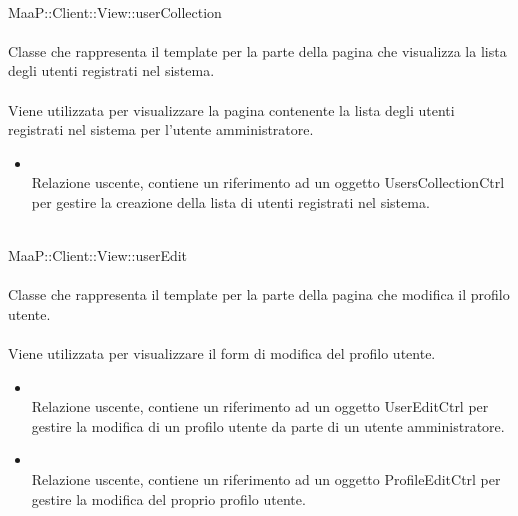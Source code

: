 \\
MaaP::Client::View::userCollection\\
\\
Classe che rappresenta il template per la parte della pagina che visualizza la lista degli utenti registrati nel sistema.\\
\\
Viene utilizzata per visualizzare la pagina contenente la lista degli utenti registrati nel sistema per l'utente amministratore.\\
\begin{itemize}
\item{}\\
Relazione uscente, contiene un riferimento ad un oggetto UsersCollectionCtrl per gestire la creazione della lista di utenti registrati nel sistema.
\end{itemize}

\\
MaaP::Client::View::userEdit\\
\\
Classe che rappresenta il template per la parte della pagina che modifica il profilo utente.\\
\\
Viene utilizzata per visualizzare il form di modifica del profilo utente.\\
\begin{itemize}
\item{}\\
Relazione uscente, contiene un riferimento ad un oggetto UserEditCtrl per gestire la modifica di un profilo utente da parte di un utente amministratore.
\item{}\\
Relazione uscente, contiene un riferimento ad un oggetto ProfileEditCtrl per gestire la modifica del proprio profilo utente.
\end{itemize}


